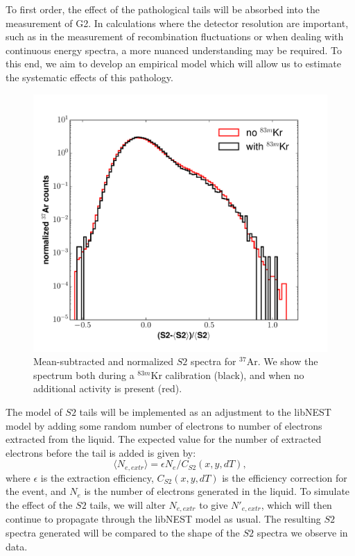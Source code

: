 {To first order, the effect of the pathological tails will be absorbed into the measurement of G2. In calculations where the detector resolution are important, such as in the measurement of recombination fluctuations or when dealing with continuous energy spectra, a more nuanced understanding may be required. To this end, we aim to develop an empirical model which will allow us to estimate the systematic effects of this pathology.
\begin{figure}[h!]
  \centering
  \includegraphics[width=\textwidth]{Figures/S2_tail_spec_Ar_rate.pdf}
  \caption{Mean-subtracted and normalized $S2$ spectra for $^{37}$Ar. We show the spectrum both during a $^{83m}$Kr calibration (black), and when no additional activity is present (red).}
\label{fig:E_spec_tails_ar} 
\end{figure}

The model of $S2$ tails will be implemented as an adjustment to the libNEST model by adding some random number of electrons to number of electrons extracted from the liquid. The expected value for the number of extracted electrons before the tail is added is given by:
\begin{equation}
\langle N_{e,extr} \rangle = \epsilon N_{e} /C_{S2}(x,y,dT),
\end{equation}
where $\epsilon$ is the extraction efficiency, $C_{S2}(x,y,dT)$ is the efficiency correction for the event, and $N_e$ is the number of electrons generated in the liquid. To simulate the effect of the $S2$ tails, we will alter $N_{e,extr}$ to give $N'_{e,extr}$, which will then continue to propagate through the libNEST model as usual. The resulting $S2$ spectra generated will be compared to the shape of the $S2$ spectra we observe in data.


}
